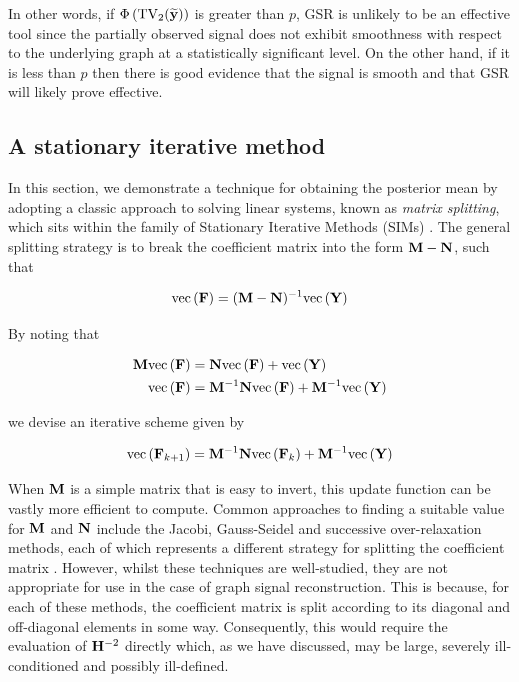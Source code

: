 {        \vspace*{0.6cm}

        In other words, if $\Phi\left(\text{TV}_2(\widetilde{\mathbf{y}})\right)$ is greater than $p$, GSR is unlikely to be an effective tool since the partially observed signal does not exhibit smoothness with respect to the underlying graph at a statistically significant level. On the other hand, if it is less than $p$ then there is good evidence that the signal is smooth and that GSR will likely prove effective. 
}

\vspace*{\fill}

\subsection{A stationary iterative method}

\label{sec:SIM}

In this section, we demonstrate a technique for obtaining the posterior mean by adopting a classic approach to solving linear systems, known as \textit{matrix splitting}, which sits within the family of Stationary Iterative Methods (SIMs) \citep{Saad2003}. The general splitting strategy is to break the coefficient matrix into the form $\mathbf{M} - \mathbf{N}$, such that 


\begin{equation}
    \text{\textup{vec}}\left(\mathbf{F}\right) = (\mathbf{M} - \mathbf{N})^{-1} \text{\textup{vec}}\left(\mathbf{Y}\right)
\end{equation}

By noting that

\begin{align}
    \mathbf{M} \text{\textup{vec}}\left(\mathbf{F}\right) &= \mathbf{N} \text{\textup{vec}}\left(\mathbf{F}\right) + \text{\textup{vec}}\left(\mathbf{Y}\right) \\
    \text{\textup{vec}}\left(\mathbf{F}\right) &= \mathbf{M}^{-1}\mathbf{N} \text{\textup{vec}}\left(\mathbf{F}\right) + \mathbf{M}^{-1} \text{\textup{vec}}\left(\mathbf{Y}\right)
\end{align}

we devise an iterative scheme given by 

\begin{equation}
    \label{eq:sim_update}
    \text{\textup{vec}}\left(\mathbf{F}_{k+1}\right) = \mathbf{M}^{-1}\mathbf{N} \text{\textup{vec}}\left(\mathbf{F}_{k}\right) + \mathbf{M}^{-1} \text{\textup{vec}}\left(\mathbf{Y}\right)
\end{equation}


When $\mathbf{M}$ is a simple matrix that is easy to invert, this update function can be vastly more efficient to compute. Common approaches to finding a suitable value for $\mathbf{M}$ and $\mathbf{N}$ include the Jacobi, Gauss-Seidel and successive over-relaxation methods, each of which represents a different strategy for splitting the coefficient matrix \citep{Saad2003}. However, whilst these techniques are well-studied, they are not appropriate for use in the case of graph signal reconstruction. This is because, for each of these methods, the coefficient matrix is split according to its diagonal and off-diagonal elements in some way. Consequently, this would require the evaluation of $\mathbf{H}^{-2}$ directly which, as we have discussed, may be large, severely ill-conditioned and possibly ill-defined. 


